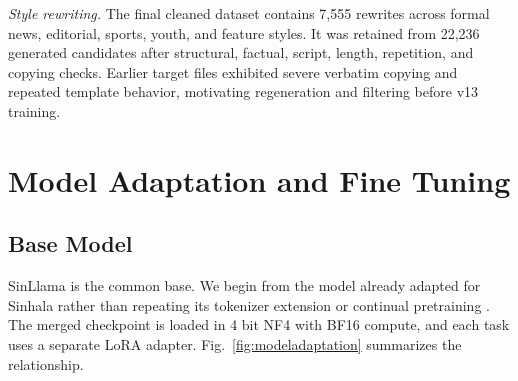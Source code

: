\documentclass[a4paper,conference]{IEEEtran}
\begin{document}
\textit{Style rewriting.} The final cleaned dataset contains 7,555 rewrites
across formal news, editorial, sports, youth, and feature styles. It was
retained from 22,236 generated candidates after structural, factual, script,
length, repetition, and copying checks. Earlier target files exhibited severe
verbatim copying and repeated template behavior, motivating regeneration and
filtering before v13 training.

\section{Model Adaptation and Fine Tuning}

\subsection{Base Model}
SinLlama is the common base. We begin from the model already adapted for Sinhala rather than
repeating its tokenizer extension or continual pretraining
\cite{aravinda2025sinllama}. The merged checkpoint is loaded in 4 bit NF4 with
BF16 compute, and each task uses a separate LoRA adapter. Fig.~\ref{fig:modeladaptation}
summarizes the relationship.
\end{document}
